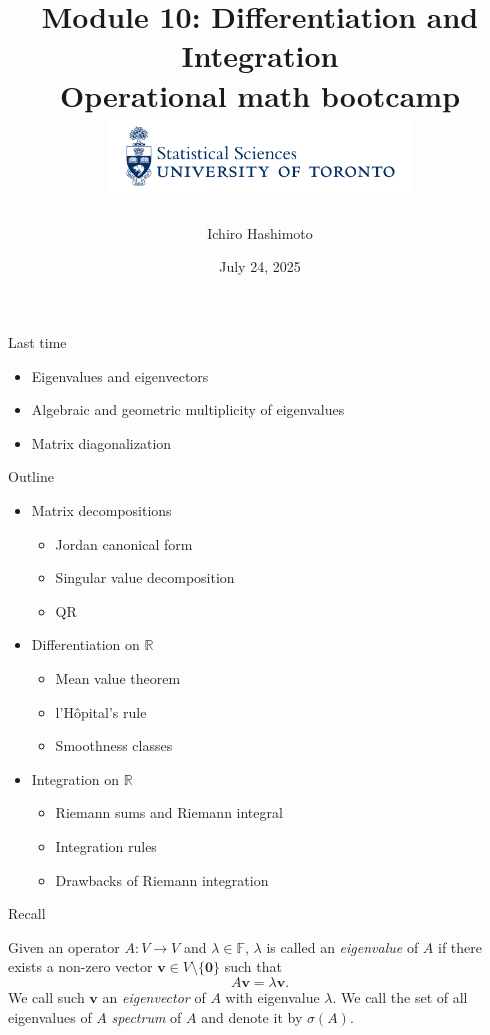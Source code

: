 \documentclass [aspectratio=169]{beamer}
\title[]{Module 10: Differentiation and Integration \\ {\large Operational math bootcamp}\\ \includegraphics[width=8cm]{dept_logo.png}\vspace{-1em}}
\author[]{Ichiro Hashimoto}
\institute[]{University of Toronto}
\date{July 24, 2025}
\newcommand{\bv}{{\mathbf{v}}}
\newcommand{\zerovec}{{\mathbf{0}}}
\newcommand{\R}{{\mathbb{R}}}
\newcommand{\F}{{\mathbb{F}}}
\begin{document}
{
\begin{frame}
    \titlepage
\end{frame}
}

\begin{frame}{Last time}
    \begin{itemize}
      \setlength\itemsep{0.5em}
    	\item Eigenvalues and eigenvectors
	\item Algebraic and geometric multiplicity of eigenvalues
	\item Matrix diagonalization
    \end{itemize}
\end{frame}

\begin{frame}{Outline}
    \begin{itemize}
      \setlength\itemsep{0.5em}
          \item Matrix decompositions
	\begin{itemize}
      \setlength\itemsep{0.25em}
	\item Jordan canonical form
	\item Singular value decomposition
	\item QR
    \end{itemize}
    	\item Differentiation on $\R$
	\begin{itemize}
      \setlength\itemsep{0.25em}
	\item Mean value theorem
	\item l'H\^{o}pital's rule
	\item Smoothness classes
    \end{itemize}
	\item Integration on $\R$
	\begin{itemize}
      \setlength\itemsep{0.25em}
	\item Riemann sums and Riemann integral
	\item Integration rules
	\item Drawbacks of Riemann integration
    \end{itemize}
    \end{itemize}
\end{frame}

\begin{frame}{Recall}

\begin{definition}
Given an operator $A \colon V \to V$ and $\lambda \in \F$, $\lambda$ is called an \emph{eigenvalue} of $A$ if there exists a non-zero vector $\bv \in V\setminus\{\zerovec\}$ such that 
$$A \bv = \lambda \bv.$$
We call such $\bv$ an \emph{eigenvector} of $A$ with eigenvalue $\lambda$. We call the set of all eigenvalues of $A$ \emph{spectrum} of $A$ and denote it by $\sigma(A)$.
\end{definition}
\end{frame}
\end{document}
